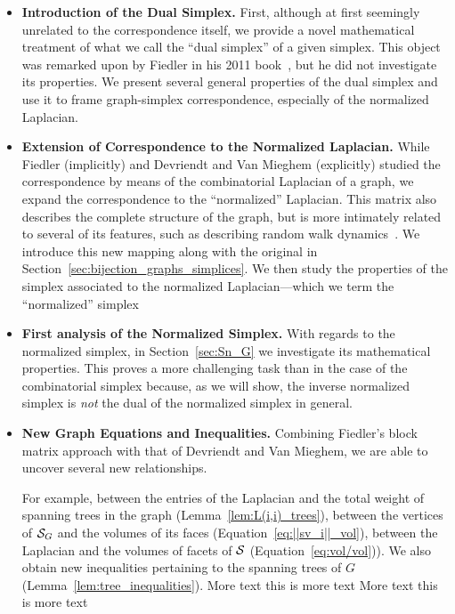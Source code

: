 \begin{itemize}
	\item {\bf Introduction of the Dual Simplex.} First, although at first seemingly unrelated to the correspondence itself, we provide a  novel mathematical treatment of what we call the ``dual simplex'' of a given simplex. This object was remarked upon by Fiedler in his 2011 book~\cite{fiedler2011matrices}, but he did not investigate its properties. We present several general properties of  the dual simplex and use it to frame graph-simplex correspondence, especially of the normalized Laplacian. 
	\item {\bf Extension of Correspondence to the Normalized Laplacian. }While Fiedler (implicitly) and Devriendt and Van Mieghem (explicitly) studied the correspondence by means of the combinatorial Laplacian of a graph, we expand the correspondence to the ``normalized'' Laplacian.  This matrix also describes the complete structure of the graph, but is more intimately related to several of its features, such as describing random walk dynamics~\cite{chung1997spectral}. We introduce this new mapping  along with the original in Section~\ref{sec:bijection_graphs_simplices}. 
	We then study the properties of the simplex associated to the normalized Laplacian---which we term the ``normalized'' simplex   
	\item {\bf First analysis of the Normalized Simplex. } With regards to the normalized simplex, in Section~\ref{sec:Sn_G} we investigate its mathematical properties. This proves a more challenging task   than  in  the case of the combinatorial simplex because, as we will show, the inverse normalized simplex  is \emph{not} the dual of the normalized  simplex in general.
	\item {\bf New Graph Equations and Inequalities.} 
	Combining Fiedler's block matrix approach with that of Devriendt and Van Mieghem, we are able to uncover several new relationships. 
	
	For example, between the  entries of the Laplacian and the total  weight of spanning trees in  the graph (Lemma~\ref{lem:L(i,i)_trees}), between the vertices of $\mathcal{S}_G$  and the volumes of its faces (Equation~\eqref{eq:||sv_i||_vol}), between the Laplacian and the volumes of facets of $\mathcal{S}$ (Equation~\eqref{eq:vol/vol})). We also  obtain new inequalities pertaining to the spanning trees of $G$ (Lemma~\ref{lem:tree_inequalities}). More text this is more text 
	More text this is more text 
	

\end{itemize}
